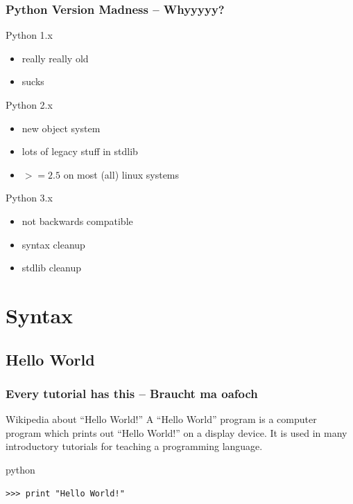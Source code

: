\documentclass{beamer}
\begin{document}
\begin{frame}[fragile]
	\frametitle{Python Version Madness -- Whyyyyy?}
	\begin{alertblock}{Python 1.x}
	\begin{itemize}
		\item really really old
		\item sucks
	\end{itemize}	
	\end{alertblock}

	\begin{block}{Python 2.x}
	\begin{itemize}
	\item new object system
	\item lots of legacy stuff in stdlib
	\item $>=2.5$ on most (all) linux systems
	\end{itemize}		
	\end{block}

	\begin{block}{Python 3.x}
	\begin{itemize}
	\item not backwards compatible
	\item syntax cleanup
	\item stdlib cleanup
	\end{itemize}	
	\end{block}
\end{frame}

\section{Syntax}
\subsection{Hello World}
\begin{frame}[fragile]
    \frametitle{Every tutorial has this -- Braucht ma oafoch}
    \begin{block}{Wikipedia about ``Hello World!''}
    A ``Hello World'' program is a computer program which prints out ``Hello World!'' on a display device. It is used in many introductory tutorials for teaching a programming language.
    \end{block}
\pause
    \begin{exampleblock}{python}
    \begin{lstlisting}
>>> print "Hello World!" 
    \end{lstlisting}
    \end{exampleblock}
\end{frame}
\end{document}
